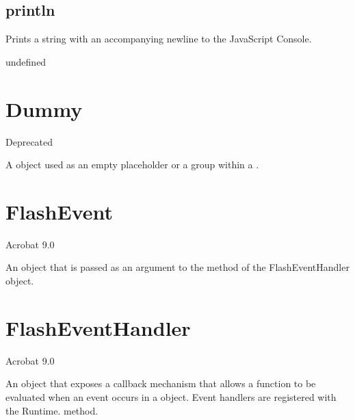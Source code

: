 \documentclass[letterpaper,12pt,english,openany,oneside]{sphinxmanual}
\begin{document}
\subsection{println}
\label{\detokenize{JS_3D_API:println}}
Prints a string with an accompanying newline to the JavaScript Console.

\label{\detokenize{JS_3D_API:syntax-17}}

\begin{sphinxVerbatim}[commandchars=\\\{\}]
\end{sphinxVerbatim}
\label{\detokenize{JS_3D_API:parameters-11}}

\label{\detokenize{JS_3D_API:section-19}}\label{\detokenize{JS_3D_API:returns-17}}

undefined


\section{Dummy}
\label{\detokenize{JS_3D_API:dummy}}
Deprecated

A  object used as an empty placeholder or a group within a .


\section{FlashEvent}
\label{\detokenize{JS_3D_API:flashevent}}
Acrobat 9.0

An object that is passed as an argument to the  method of the FlashEventHandler object.

\label{\detokenize{JS_3D_API:properties-7}}


\section{FlashEventHandler}
\label{\detokenize{JS_3D_API:flasheventhandler}}
Acrobat 9.0

An object that exposes a callback mechanism that allows a function to be evaluated when an event occurs in a  object. Event handlers are registered with the Runtime.  method.
\end{document}
